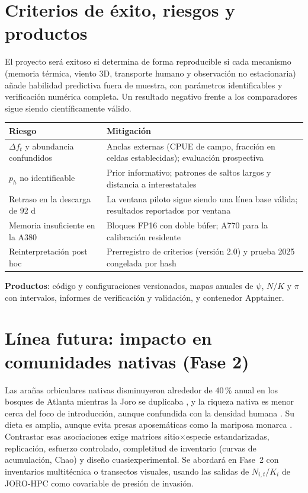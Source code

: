 \documentclass[11pt,letterpaper]{article}
\begin{document}
\section{Criterios de éxito, riesgos y productos}
El proyecto será exitoso si determina de forma reproducible si cada mecanismo (memoria térmica, viento 3D, transporte humano y observación no estacionaria) añade habilidad predictiva fuera de muestra, con parámetros identificables y verificación numérica completa. Un resultado negativo frente a los comparadores sigue siendo científicamente válido.

\begin{center}\small
\begin{tabularx}{\textwidth}{@{}p{4.2cm}Y@{}}\toprule
Riesgo & Mitigación\\\midrule
$\Delta f_t$ y abundancia confundidos & Anclas externas (CPUE de campo, fracción en celdas establecidas); evaluación prospectiva\\
$p_h$ no identificable & Prior informativo; patrones de saltos largos y distancia a interestatales\\
Retraso en la descarga de 92 d & La ventana piloto sigue siendo una línea base válida; resultados reportados por ventana\\
Memoria insuficiente en la A380 & Bloques FP16 con doble búfer; A770 para la calibración residente\\
Reinterpretación post hoc & Prerregistro de criterios (versión 2.0) y prueba 2025 congelada por hash\\
\bottomrule\end{tabularx}\end{center}
\textbf{Productos}: código y configuraciones versionados, mapas anuales de $\psi$, $N/K$ y $\pi$ con intervalos, informes de verificación y validación, y contenedor Apptainer.

\section{Línea futura: impacto en comunidades nativas (Fase 2)}
\label{sec:futuro}
Las arañas orbiculares nativas disminuyeron alrededor de 40\,\% anual en los bosques de Atlanta mientras la Joro se duplicaba \cite{pemberton2025}, y la riqueza nativa es menor cerca del foco de introducción, aunque confundida con la densidad humana \cite{nelsen2023}. Su dieta es amplia, aunque evita presas aposemáticas como la mariposa monarca \cite{davis2024}. Contrastar esas asociaciones exige matrices sitio$\times$especie estandarizadas, replicación, esfuerzo controlado, completitud de inventario (curvas de acumulación, Chao) y diseño cuasiexperimental. Se abordará en Fase~2 con inventarios multitécnica o transectos visuales, usando las salidas de $N_{i,t}/K_i$ de JORO-HPC como covariable de presión de invasión.
\end{document}
